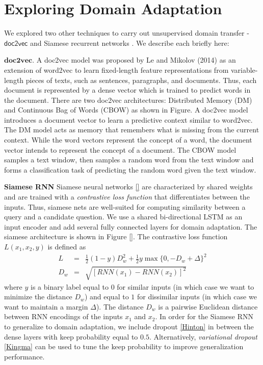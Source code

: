 \documentclass{sigkddExp}
\begin{document}
\section{Exploring Domain Adaptation}
\label{other_techniques}
We explored two other techniques to carry out unsupervised domain transfer - $\textsf{doc2vec}$ \cite{doc2vec1} and Siamese recurrent networks \cite{siamese}. We describe each briefly here:
\begin{itemize}[topsep=0pt,itemsep=-1ex,partopsep=1ex,parsep=1ex]
{\color{red}
\item $\textbf{doc2vec}$. A doc2vec model was proposed by Le and Mikolov (2014) as an extension of word2vec to learn fixed-length feature representations from variable-length pieces of texts, such as sentences, paragraphs, and documents. Thus, each document is represented by a dense vector which is trained to predict words in the document. There are two doc2vec architectures: Distributed Memory (DM) and Continuous Bag of Words (CBOW) as shown in Figure{}. A doc2vec model introduces a document vector to learn a predictive context similar to word2vec. The DM model acts as memory that remembers what is missing from the current context. While the word vectors represent the concept of a word, the document vector intends to represent the concept of a document. The CBOW model samples a text window, then samples a random word from the text window and forms a classification task of predicting the random word given the text window.
}
\item \textbf{Siamese RNN} 
{\color{red} Siamese neural networks \ref{} are characterized by shared weights and are trained with a \textit{contrastive loss function} that differentiates between the inputs. Thus, siamese nets are well-suited for computing similarity between a query and a candidate question. We use a shared bi-directional LSTM as an input encoder and add several fully connected layers for domain adaptation. The siamese architecture is shown in Figure \ref{}. The contrastive loss function $L(x_1,x_2,y)$ is defined as
\begin{eqnarray}
L &=& \frac{1}{2}(1-y)D_{w}^{2} + \frac{1}{2}y \max \{0, -D_w + \Delta\}^{2} \\
D_w &=& \sqrt{[RNN(x_1) - RNN(x_2)]^2}
\end{eqnarray}
where $y$ is a binary label equal to $0$ for similar inputs (in which case we want to minimize the distance $D_w$) and equal to $1$ for dissimilar inputs (in which case we want to maintain a margin $\Delta$). The distance $D_w$ is a pairwise Euclidean distance between RNN encodings of the inputs $x_1$ and $x_2$. In order for the Siamese RNN to generalize to domain adaptation, we include dropout \ref{Hinton} in between the dense layers with keep probability equal to $0.5$. Alternatively, \textit{variational dropout} \ref{Kingma} can be used to tune the keep probability to improve generalization performance.
}

\end{itemize}
\end{document}

